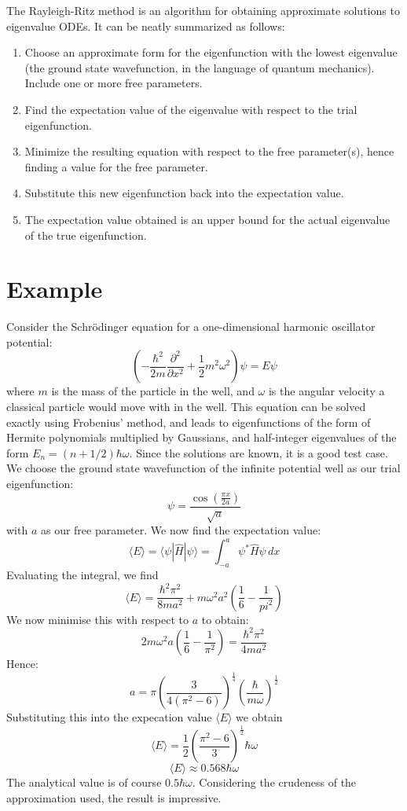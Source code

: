 \documentclass[12pt]{article}
\begin{document}
The Rayleigh-Ritz method is an algorithm for obtaining approximate solutions to eigenvalue ODEs. It can be neatly summarized as follows:
\begin{enumerate}
\item Choose an approximate form for the eigenfunction with the lowest eigenvalue (the ground state wavefunction, in the language of quantum mechanics). Include one or more free parameters.
\item Find the expectation value of the eigenvalue with respect to the trial eigenfunction.
\item Minimize the resulting equation with respect to the free parameter(s), hence finding a value for the free parameter.
\item Substitute this new eigenfunction back into the expectation value.
\item The expectation value obtained is an upper bound for the actual eigenvalue of the true eigenfunction.
\end{enumerate}
\section{Example}
Consider the Schr\"odinger equation for a one-dimensional harmonic oscillator potential:
\[
\left(-\frac{\hbar^2}{2m} \frac{\partial^2}{\partial x^2} + \frac{1}{2} m^2\omega^2\right)\psi = E\psi
\]
where $m$ is the mass of the particle in the well, and $\omega$ is the angular velocity a classical particle would move with in the well. This equation can be solved exactly using Frobenius' method, and leads to eigenfunctions of the form of Hermite polynomials multiplied by Gaussians, and half-integer eigenvalues of the form $E_n = (n+1/2)\hbar \omega$. Since the solutions are known, it is a good test case. We choose the ground state wavefunction of the infinite potential well as our trial eigenfunction:
\[
\psi = \frac{\cos(\frac{\pi x}{2a})}{\sqrt{a}}
\]
with $a$ as our free parameter.
We now find the expectation value:
\[
\langle E \rangle = \langle \psi | \hat{H} | \psi \rangle = \int^a_{-a} \psi^* \hat{H} \psi \, dx
\]
Evaluating the integral, we find
\[
\langle E \rangle = \frac{\hbar^2 \pi^2}{8ma^2} +m\omega^2a^2\left(\frac{1}{6} - \frac{1}{pi^2}\right)
\]
We now minimise this with respect to $a$ to obtain:
\[
2m\omega^2a\left(\frac{1}{6} - \frac{1}{\pi^2}\right) = \frac{\hbar^2 \pi^2}{4ma^2}
\]
Hence:
\[
a = \pi\left(\frac{3}{4(\pi^2-6)}\right)^{\frac{1}{4}}\left(\frac{\hbar}{m\omega}\right)^{\frac{1}{2}}
\]
Substituting this into the expecation value $\langle E \rangle$ we obtain
\[
\langle E \rangle = \frac{1}{2} \left(\frac{\pi^2-6}{3}\right)^{\frac{1}{2}}\hbar\omega
\]
\[
\langle E \rangle \approx 0.568\hbar \omega
\]
The analytical value is of course $0.5\hbar \omega$. Considering the crudeness of the approximation used, the result is impressive.
\end{document}
